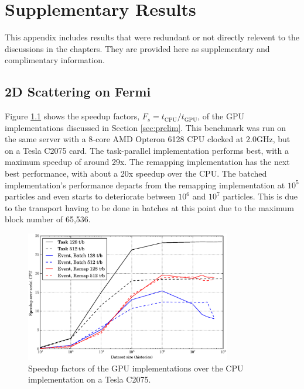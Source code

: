 \chapter{Supplementary Results}
\label{app:A}

This appendix includes results that were redundant or not directly relevent to the discussions in the chapters.  They are provided here as supplementary and complimentary information.

\section{2D Scattering on Fermi}

Figure \ref{prelim_speedup_old} shows the speedup factors, $F_s=t_\mathrm{CPU}/t_\mathrm{GPU}$, of the GPU implementations discussed in Section \ref{sec:prelim}.  This benchmark was run on the same server with a 8-core AMD Opteron 6128 CPU clocked at 2.0GHz, but on a Tesla C2075 card.   The task-parallel implementation performs best, with a maximum speedup of around 29x.  The remapping implementation has the next best performance, with about a 20x speedup over the CPU. The batched implementation's performance departs from the remapping implementation at $10^5$ particles and even starts to deteriorate between $10^6$ and $10^7$ particles.  This is due to the transport having to be done in batches at this point due to the maximum block number of 65,536.  

\begin{figure}[h!] 
  \centering
    \includegraphics[width=0.8\textwidth]{graphics/prelim_speedup_old.eps}
     \caption{Speedup factors of the GPU implementations over the CPU implementation on a Tesla C2075. \label{prelim_speedup_old} }
\end{figure}


